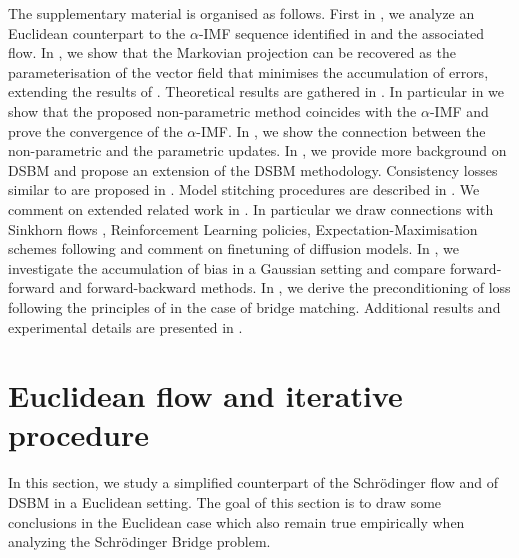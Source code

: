 \documentclass{article}
\begin{document}
The supplementary material is organised as follows. First in , we analyze an Euclidean counterpart to the $\alpha$-IMF sequence identified in  and the associated flow. In , we show that the Markovian projection can be recovered as the parameterisation of the vector field that minimises the accumulation of errors, extending the results of \cite{chen2024probabilistic}. 
    Theoretical results are gathered in . In particular in  we show that the proposed non-parametric method coincides with the $\alpha$-IMF and prove the convergence of the $\alpha$-IMF. In , we show the connection between the non-parametric and the parametric updates. In , we provide more background on DSBM and propose an extension of the DSBM methodology. Consistency losses similar to \citep{daras2024ambient,debortoli2024target} are proposed in . Model stitching procedures are described in . We comment on extended related work in . In particular we draw connections with Sinkhorn flows \citep{karimi2024sinkhorn}, Reinforcement Learning policies, Expectation-Maximisation schemes following \citep{brekelmans2023schrodinger} and comment on finetuning of diffusion models. In , we investigate the accumulation of bias in a Gaussian setting and compare forward-forward and forward-backward methods. In , we derive the preconditioning of loss following the principles of \citep{karras2022elucidating} in the case of bridge matching. Additional results and experimental details are presented in .

\section{Euclidean flow and iterative procedure}
\label{sec:euclidean_flow}

In this section, we study a simplified counterpart of the Schr\"odinger flow and of DSBM in a Euclidean setting. The goal of this section is to draw some conclusions in the Euclidean case which also remain true empirically when analyzing the Schr\"odinger Bridge problem.
\end{document}

